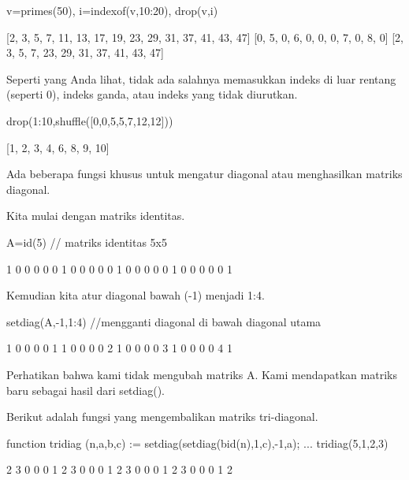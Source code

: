 \documentclass{article}
\begin{document}
\>v=primes(50), i=indexof(v,10:20), drop(v,i)


    [2,  3,  5,  7,  11,  13,  17,  19,  23,  29,  31,  37,  41,  43,  47]
    [0,  5,  0,  6,  0,  0,  0,  7,  0,  8,  0]
    [2,  3,  5,  7,  23,  29,  31,  37,  41,  43,  47]

Seperti yang Anda lihat, tidak ada salahnya memasukkan indeks di luar
rentang (seperti 0), indeks ganda, atau indeks yang tidak diurutkan.


\>drop(1:10,shuffle([0,0,5,5,7,12,12]))


    [1,  2,  3,  4,  6,  8,  9,  10]

Ada beberapa fungsi khusus untuk mengatur diagonal atau menghasilkan
matriks diagonal.


Kita mulai dengan matriks identitas.


\>A=id(5) // matriks identitas 5x5


                1             0             0             0             0 
                0             1             0             0             0 
                0             0             1             0             0 
                0             0             0             1             0 
                0             0             0             0             1 

Kemudian kita atur diagonal bawah (-1) menjadi 1:4.


\>setdiag(A,-1,1:4) //mengganti diagonal di bawah diagonal utama


                1             0             0             0             0 
                1             1             0             0             0 
                0             2             1             0             0 
                0             0             3             1             0 
                0             0             0             4             1 

Perhatikan bahwa kami tidak mengubah matriks A. Kami mendapatkan
matriks baru sebagai hasil dari setdiag().


Berikut adalah fungsi yang mengembalikan matriks tri-diagonal.


\>function tridiag (n,a,b,c) := setdiag(setdiag(b\*id(n),1,c),-1,a); ...  
\>   tridiag(5,1,2,3)


                2             3             0             0             0 
                1             2             3             0             0 
                0             1             2             3             0 
                0             0             1             2             3 
                0             0             0             1             2 
\end{document}
